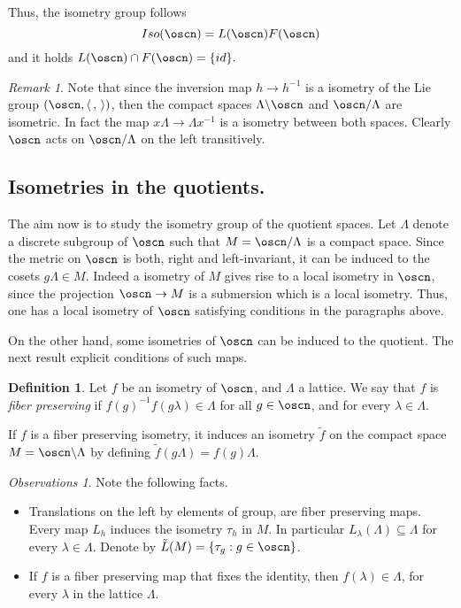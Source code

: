 \documentclass[12pt]{amsart}
\newcommand{\lela}{\left \langle}
\newcommand{\rira}{\right \rangle}
\theoremstyle{plain}
\theoremstyle{definition}
\newtheorem{defn}[thm]{Definition}
\theoremstyle{remark}
\newtheorem{rem}{Remark}
\newtheorem{obs}[thm]{Observations}
\begin{document}
Thus, the isometry group follows 
$$Iso(\oscn)=L(\oscn) F(\oscn)$$
 and it holds $L(\oscn)\cap F(\oscn)=\{id\}.$


\begin{rem}
	Note that since the inversion map $h\to h^{-1}$ is a isometry of the Lie group  $(\oscn, \lela\,,\,\rira)$, then the compact spaces $\Lambda \backslash \oscn$ and $\oscn/\Lambda$ are isometric. In fact the map $x\Lambda \to \Lambda x^{-1}$ is a isometry between both spaces. Clearly $\oscn$ acts on $\oscn/\Lambda$ on the left transitively.
\end{rem}

\subsection{Isometries in the quotients. } The aim now is to study the isometry group of the quotient spaces. Let $\Lambda$ denote a discrete subgroup of $\oscn$ such that  $M=\oscn/\Lambda$ is a compact space. Since the metric on $\oscn$ is both, right and left-invariant, it can be induced to the cosets $g\Lambda\in M$. Indeed a isometry of $M$ gives rise to a local isometry in $\oscn$, since the projection $\oscn \to M$ is a submersion which is a local isometry. Thus, one has a local isometry of $\oscn$ satisfying conditions in the paragraphs above. 

On the other hand, some isometries of $\oscn$ can be induced to the quotient. The next result explicit conditions of such maps. 

\begin{defn} Let $f$ be  an isometry of $\oscn$, and $\Lambda$ a lattice. We say that $f$ is {\em fiber preserving} if $f(g)^{-1} f(g\lambda) \in\Lambda$ for all $g \in \oscn$, and for every $\lambda\in \Lambda$. 
\end{defn}
		If $f$ is a fiber preserving
isometry, it induces an isometry  $\tilde{f}$ on the compact space $M=\oscn\backslash \Lambda$   by defining $\tilde{f}(g\Lambda) = f(g)\Lambda$. 


\begin{obs} Note the following facts. 
	\begin{itemize}
		\item Translations on the left by elements of group, are fiber preserving maps. Every map $L_h$ induces the isometry $\tau_h$ in $M$. In particular $L_{\lambda}(\Lambda)\subseteq \Lambda$ for every $\lambda\in \Lambda$. Denote by  $\tilde{L}(M)=\{\tau_g:g\in \oscn\}$. 
		\item If $f$ is a fiber preserving map that fixes the identity, then $f(\lambda)\in \Lambda$, for every $\lambda$ in the lattice $\Lambda$. 
	\end{itemize}
	
\end{obs}
\end{document}
